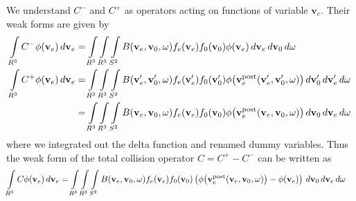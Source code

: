 \documentclass{article}
\newcommand{\myint}{\int\limits}
\newcommand{\diff}[1]{\, d#1}
\newcommand{\vect}[1]{\mathbf{#1}}
\newcommand{\of}[1]{\mleft( #1 \mright)}
\begin{document}
We understand $C^-$ and $C^+$ as operators acting on functions of variable $\vect{v}_e$. Their weak forms are given by
\begin{align*}
\myint_{R^3} C^- \phi\of{\vect{v}_e} \diff{\vect{v}_e} 
&=
\myint_{R^3} \myint_{R^3} \myint_{S^2} 
B\of{\vect{v}_e, \vect{v}_0, \vect{\omega}} 
f_e\of{\vect{v}_e} f_0\of{\vect{v}_0} 
\phi\of{\vect{v}_e} 
\diff{\vect{v}_e} \diff{\vect{v}_0} \diff{\vect{\omega}}
\\
\myint_{R^3} C^+ \phi\of{\vect{v}_e} \diff{\vect{v}_e} 
&= 
\myint_{R^3} \myint_{R^3} \myint_{S^2} 
B\of{\vect{v}_e^\prime, \vect{v}_0^\prime, \vect{\omega}} 
f_e\of{\vect{v}_e^\prime} f_0\of{\vect{v}_0^\prime} 
\phi\of{\vect{v}_e^\text{post}\of{\vect{v}_e^\prime, \vect{v}_0^\prime, \vect{\omega}}} 
\diff{\vect{v}_0^\prime} \diff{\vect{v}_e^\prime} \diff{\vect{\omega}}
\\
&= 
\myint_{R^3} \myint_{R^3} \myint_{S^2} 
B\of{\vect{v}_e, \vect{v}_0, \vect{\omega}} 
f_e\of{\vect{v}_e} f_0\of{\vect{v}_0} 
\phi\of{\vect{v}_e^\text{post}\of{\vect{v}_e, \vect{v}_0, \vect{\omega}}} 
\diff{\vect{v}_0} \diff{\vect{v}_e} \diff{\vect{\omega}}
\end{align*}
where we integrated out the delta function and renamed dummy variables. Thus the weak form of the total collision operator $C = C^+ - C^-$ can be written as 
\begin{align*}
\myint_{R^3} C \phi\of{\vect{v}_e} \diff{\vect{v}_e} 
&=
\myint_{R^3} \myint_{R^3} \myint_{S^2} 
B\of{\vect{v}_e, \vect{v}_0, \vect{\omega}} 
f_e\of{\vect{v}_e} f_0\of{\vect{v}_0} 
\left(
\phi\of{\vect{v}_e^\text{post}\of{\vect{v}_e, \vect{v}_0, \vect{\omega}}} 
- \phi\of{\vect{v}_e} 
\right)
\diff{\vect{v}_0} \diff{\vect{v}_e} \diff{\vect{\omega}}
\end{align*}
\end{document}
